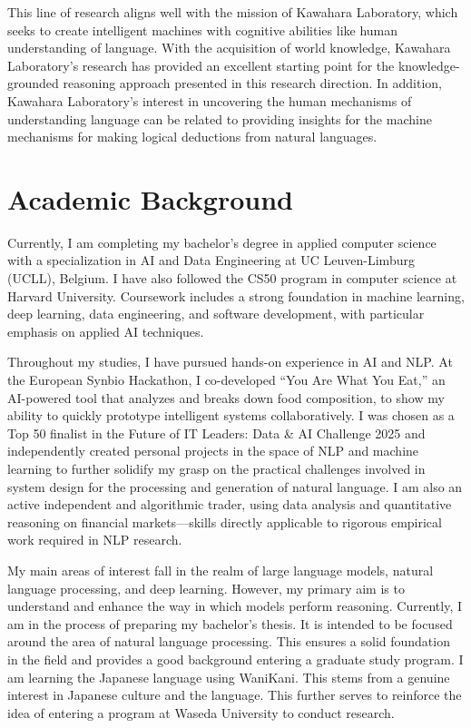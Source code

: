 This line of research aligns well with the mission of Kawahara Laboratory, which seeks to create intelligent machines with cognitive abilities like human understanding of language. With the acquisition of world knowledge, Kawahara Laboratory's research has provided an excellent starting point for the knowledge-grounded reasoning approach presented in this research direction. In addition, Kawahara Laboratory's interest in uncovering the human mechanisms of understanding language can be related to providing insights for the machine mechanisms for making logical deductions from natural languages.

\section{Academic Background}

Currently, I am completing my bachelor's degree in applied computer science with a specialization in AI and Data Engineering at UC Leuven-Limburg (UCLL), Belgium. I have also followed the CS50 program in computer science at Harvard University. Coursework includes a strong foundation in machine learning, deep learning, data engineering, and software development, with particular emphasis on applied AI techniques.

Throughout my studies, I have pursued hands-on experience in AI and NLP. At the European Synbio Hackathon, I co-developed ``You Are What You Eat,'' an AI-powered tool that analyzes and breaks down food composition, to show my ability to quickly prototype intelligent systems collaboratively. I was chosen as a Top 50 finalist in the Future of IT Leaders: Data \& AI Challenge 2025 and independently created personal projects in the space of NLP and machine learning to further solidify my grasp on the practical challenges involved in system design for the processing and generation of natural language. I am also an active independent and algorithmic trader, using data analysis and quantitative reasoning on financial markets---skills directly applicable to rigorous empirical work required in NLP research.

My main areas of interest fall in the realm of large language models, natural language processing, and deep learning. However, my primary aim is to understand and enhance the way in which models perform reasoning. Currently, I am in the process of preparing my bachelor's thesis. It is intended to be focused around the area of natural language processing. This ensures a solid foundation in the field and provides a good background entering a graduate study program. I am learning the Japanese language using WaniKani. This stems from a genuine interest in Japanese culture and the language. This further serves to reinforce the idea of entering a program at Waseda University to conduct research.
